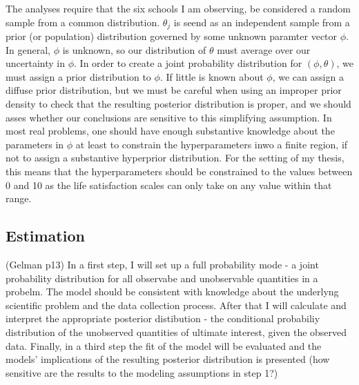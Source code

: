 \documentclass[a4, 12pt]{article}
\begin{document}
The analyses require that the six schools I am observing, be considered a random sample from a common distribution. \(\theta_j\) is seend as an independent sample from a prior (or population) distribution governed by some unknown paramter vector \(\phi\). In general, \(\phi\) is unknown, so our distribution of \(\theta\) must average over our uncertainty in \(\phi\). In order to create a joint probability distribution for \((\phi,\theta)\), we must assign a prior distribution to \(\phi\). If little is known about \(\phi\), we can assign a diffuse prior distribution, but we must be careful when using an improper prior density to check that the resulting posterior distribution is proper, and we should asses whether our conclusions are sensitive to this simplifying assumption. In most real problems, one should have enough substantive knowledge about the parameters in \(\phi\) at least to constrain the hyperparameters inwo a finite region, if not to assign a substantive hyperprior distribution. For the setting of my thesis, this means that the hyperparameters should be constrained to the values between 0 and 10 as the life satisfaction scales can only take on any value within that range.

\hypertarget{estimation}{%
\subsection{Estimation}\label{estimation}}

\label{estimation}
(Gelman p13)
In a first step, I will set up a full probability mode - a joint probability distribution for all observabe and unobservable quantities in a probelm. The model should be consistent with knowledge about the underlyng scientific problem and the data collection process.
After that I will calculate and interpret the appropriate posterior distibution - the conditional probabiliy distribution of the unobserved quantities of ultimate interest, given the observed data.
Finally, in a third step the fit of the model will be evaluated and the models' implications of the resulting posterior distribution is presented (how sensitive are the results to the modeling assumptions in step 1?)
\end{document}
